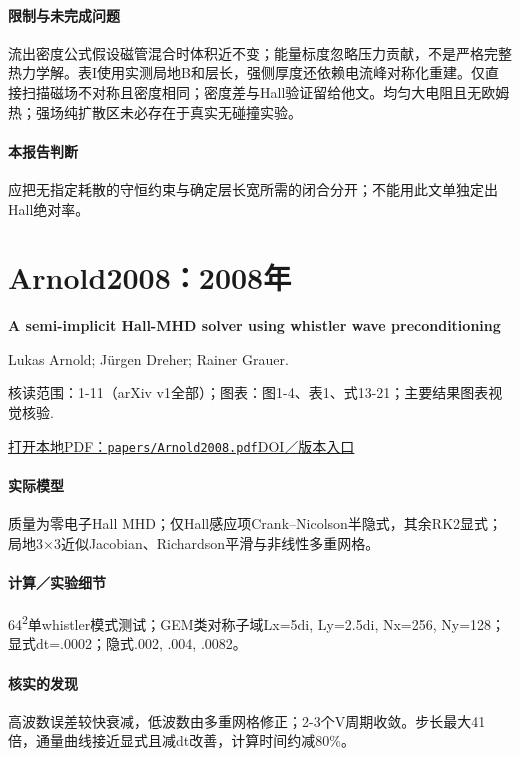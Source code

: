 \paragraph{限制与未完成问题}流出密度公式假设磁管混合时体积近不变；能量标度忽略压力贡献，不是严格完整热力学解。表I使用实测局地B和层长，强侧厚度还依赖电流峰对称化重建。仅直接扫描磁场不对称且密度相同；密度差与Hall验证留给他文。均匀大电阻且无欧姆热；强场纯扩散区未必存在于真实无碰撞实验。

\paragraph{本报告判断}应把无指定耗散的守恒约束与确定层长宽所需的闭合分开；不能用此文单独定出Hall绝对率。

\section{Arnold2008：2008年}\label{paper:Arnold2008}

\textbf{A semi-implicit Hall-MHD solver using whistler wave preconditioning}\citep{Arnold2008}\

Lukas Arnold;  Jürgen Dreher;  Rainer Grauer.

\textsf{核读范围：}1-11（arXiv v1全部）；\textsf{图表：}图1-4、表1、式13-21；主要结果图表视觉核验.

\href{run:papers/Arnold2008.pdf}{打开本地PDF：\texttt{papers/Arnold2008.pdf}}\quad\href{https://doi.org/10.1016/j.cpc.2007.11.018}{DOI／版本入口}

\paragraph{实际模型}质量为零电子Hall MHD；仅Hall感应项Crank–Nicolson半隐式，其余RK2显式；局地3×3近似Jacobian、Richardson平滑与非线性多重网格。

\paragraph{计算／实验细节}64\textsuperscript{2}单whistler模式测试；GEM类对称子域Lx=5di, Ly=2.5di, Nx=256, Ny=128；显式dt=.0002；隐式.002, .004, .0082。

\paragraph{核实的发现}高波数误差较快衰减，低波数由多重网格修正；2-3个V周期收敛。步长最大41倍，通量曲线接近显式且减dt改善，计算时间约减80\%。

